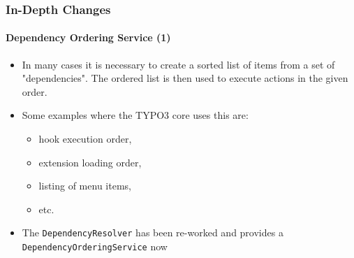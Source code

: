 \begin{frame}[fragile]
	\frametitle{In-Depth Changes}
	\framesubtitle{Dependency Ordering Service (1)}

	\begin{itemize}

		\item In many cases it is necessary to create a sorted list of items from a set of "dependencies".
			The ordered list is then used to execute actions in the given order.

		\item Some examples where the TYPO3 core uses this are:

			\begin{itemize}
				\item hook execution order,
				\item extension loading order,
				\item listing of menu items,
				\item etc.
			\end{itemize}

		\item The \texttt{DependencyResolver} has been re-worked and provides a
			\texttt{DependencyOrderingService} now

	\end{itemize}

\end{frame}


